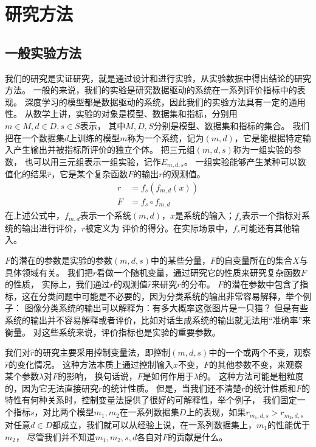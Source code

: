 
\chapter{研究方法}\label{ch:method}

\section{一般实验方法}\label{sec:general_experiment_method}
我们的研究是实证研究，就是通过设计和进行实验，从实验数据中得出结论的研究方法。
一般的来说，我们的实验是研究数据驱动的系统在一系列评价指标中的表现。
深度学习的模型都是数据驱动的系统，因此我们的实验方法具有一定的通用性。
从数学上讲，实验的对象是模型、数据集和指标，分别用$m\in M, d\in D, s\in S$表示，
其中$M, D, S$分别是模型、数据集和指标的集合。
我们把在一个数据集$d$上训练的模型$m$称为一个系统，记为$(m, d)$，它是能根据特定输入产生输出并被指标所评价的独立个体。
把三元组$(m, d, s)$称为一组实验的参数， 也可以用三元组表示一组实验，记作$E_{m, d, s}$。
一组实验能够产生某种可以数值化的结果$\hat{r}$，它是某个复杂函数$\mathit{F}$的输出$r$的观测值。
\begin{align}
    r &= f_s\left( f_{m, d}(x) \right) \\
    \mathit{F} &= f_s \circ f_{m, d}
\end{align}
在上述公式中，$f_{m, d}$表示一个系统$(m, d)$，$x$是系统的输入；$f_s$表示一个指标对系统的输出进行评价，$r$被定义为
评价的得分。在实际场景中，$f_s$可能还有其他输入。

$\mathit{F}$的潜在的参数是实验的参数$(m, d, s)$中的某些分量，$\mathit{F}$的自变量所在的集合$X$与具体领域有关。
我们把$r$看做一个随机变量，通过研究它的性质来研究复杂函数$\mathit{F}$的性质，
实际上，我们通过$r$的观测值$\hat{r}$来研究$r$的分布。
$\mathit{F}$的潜在参数中包含了指标，这在分类问题中可能是不必要的，因为分类系统的输出非常容易解释，举个例子：
图像分类系统的输出可以解释为：有多大概率这张图片是一只猫？
但是有些系统的输出并不容易解释或者评价，比如对话生成系统的输出就无法用“准确率”来衡量。
对这些系统来说，评价指标也是实验的重要参数。

我们对$\hat{r}$的研究主要采用控制变量法，即控制$(m, d, s)$中的一个或两个不变，观察$\hat{r}$的变化情况。
这种方法本质上通过控制输入$x$不变，$\mathit{F}$的其他参数不变，来观察某个参数$\lambda$对$\mathit{F}$的影响，
换句话说，$\mathit{F}$是如何作用于$\lambda$的。
这种方法可能是粗粒度的，因为它无法直接研究$r$的统计性质。
但是，当我们还不清楚$r$的统计性质和$\mathit{F}$的特性有何种关系时，控制变量法提供了很好的可解释性，举个例子，
我们固定一个指标$s$，对比两个模型$m_1, m_2$在一系列数据集$D$上的表现，如果$r_{m_1, d, s} > r_{m_2, d, s}$
对任意$d\in D$都成立，我们就可以从经验上说，在一系列数据集上，$m_1$的性能优于$m_2$，
尽管我们并不知道$m_1, m_2, s, d$各自对$\mathit{F}$的贡献是什么。


